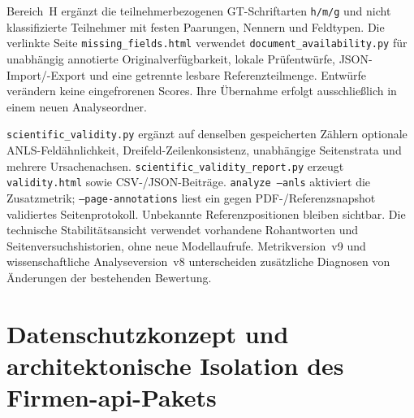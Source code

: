 Bereich~H ergänzt die teilnehmerbezogenen GT-Schriftarten \texttt{h/m/g} und nicht klassifizierte Teilnehmer mit festen Paarungen, Nennern und Feldtypen. Die verlinkte Seite \texttt{missing\_fields.html} verwendet \texttt{document\_availability.py} für unabhängig annotierte Originalverfügbarkeit, lokale Prüfentwürfe, JSON-Import/-Export und eine getrennte lesbare Referenzteilmenge. Entwürfe verändern keine eingefrorenen Scores. Ihre Übernahme erfolgt ausschließlich in einem neuen Analyseordner.

\texttt{scientific\_validity.py} ergänzt auf denselben gespeicherten Zählern optionale ANLS-Feldähnlichkeit, Dreifeld-Zeilenkonsistenz, unabhängige Seitenstrata und mehrere Ursachenachsen. \texttt{scientific\_validity\_report.py} erzeugt \texttt{validity.html} sowie CSV-/JSON-Beiträge. \texttt{analyze --anls} aktiviert die Zusatzmetrik; \texttt{--page-annotations} liest ein gegen PDF-/Referenzsnapshot validiertes Seitenprotokoll. Unbekannte Referenzpositionen bleiben sichtbar. Die technische Stabilitätsansicht verwendet vorhandene Rohantworten und Seitenversuchshistorien, ohne neue Modellaufrufe. Metrikversion~v9 und wissenschaftliche Analyseversion~v8 unterscheiden zusätzliche Diagnosen von Änderungen der bestehenden Bewertung.

\section{Datenschutzkonzept und architektonische Isolation des Firmen-\texorpdfstring{\ac{api}}{API}-Pakets}
\label{sec:umsetzung-datenschutz-api}

